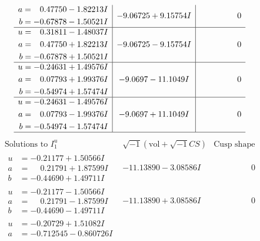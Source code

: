 \documentclass[1p]{elsarticle_modified}
\theoremstyle{definition}
\newcommand{\I}{\sqrt{-1}}
\begin{document}
$$\begin{array}{c|c|c}
\begin{aligned}
a &= \phantom{-}0.47750 - 1.82213 I \\
b &= -0.67878 - 1.50521 I\end{aligned}
 & -9.06725 + 9.15754 I & \phantom{-0.000000 } 0 \\ \hline\begin{aligned}
u &= \phantom{-}0.31811 - 1.48037 I \\
a &= \phantom{-}0.47750 + 1.82213 I \\
b &= -0.67878 + 1.50521 I\end{aligned}
 & -9.06725 - 9.15754 I & \phantom{-0.000000 } 0 \\ \hline\begin{aligned}
u &= -0.24631 + 1.49576 I \\
a &= \phantom{-}0.07793 + 1.99376 I \\
b &= -0.54974 + 1.57474 I\end{aligned}
 & -9.0697 - 11.1049 I & \phantom{-0.000000 } 0 \\ \hline\begin{aligned}
u &= -0.24631 - 1.49576 I \\
a &= \phantom{-}0.07793 - 1.99376 I \\
b &= -0.54974 - 1.57474 I\end{aligned}
 & -9.0697 + 11.1049 I & \phantom{-0.000000 } 0\\
 \hline 
 \end{array}$$\newpage$$\begin{array}{c|c|c}  
\text{Solutions to }I^u_{1}& \I (\text{vol} + \sqrt{-1}CS) & \text{Cusp shape}\\
 \hline 
\begin{aligned}
u &= -0.21177 + 1.50566 I \\
a &= \phantom{-}0.21791 + 1.87599 I \\
b &= -0.44690 + 1.49711 I\end{aligned}
 & -11.13890 - 3.08586 I & \phantom{-0.000000 } 0 \\ \hline\begin{aligned}
u &= -0.21177 - 1.50566 I \\
a &= \phantom{-}0.21791 - 1.87599 I \\
b &= -0.44690 - 1.49711 I\end{aligned}
 & -11.13890 + 3.08586 I & \phantom{-0.000000 } 0 \\ \hline\begin{aligned}
u &= -0.20729 + 1.51082 I \\
a &= -0.712545 - 0.860726 I \\

\end{aligned}
\end{array}$$
\end{document}
